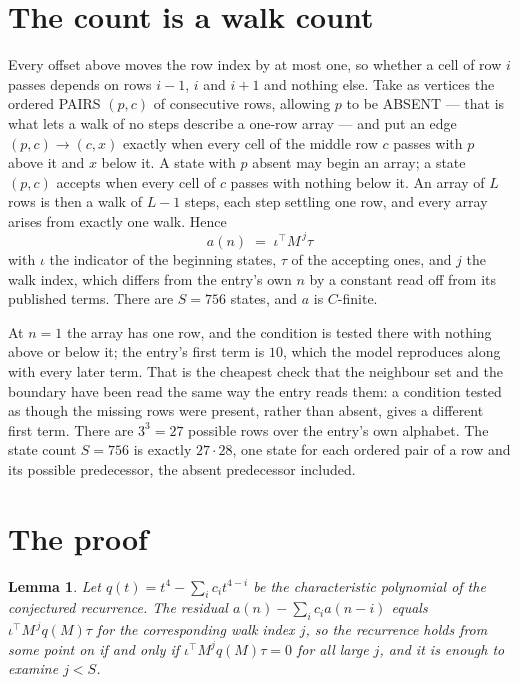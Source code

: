 \documentclass[11pt,a4paper]{article}
\theoremstyle{plain}
\newtheorem{lemma}[theorem]{Lemma}
\theoremstyle{definition}
\begin{document}
\section{The count is a walk count}

Every offset above moves the row index by at most one, so whether a cell of row $i$ passes
depends on rows $i-1$, $i$ and $i+1$ and nothing else. Take as vertices the ordered PAIRS
$(p,c)$ of consecutive rows, allowing $p$ to be ABSENT --- that is what lets a walk of no steps
describe a one-row array --- and put an edge $(p,c)\to(c,x)$ exactly when every cell of the
middle row $c$ passes with $p$ above it and $x$ below it. A state with $p$ absent may begin an
array; a state $(p,c)$ accepts when every cell of $c$ passes with nothing below it. An array of
$L$ rows is then a walk of $L-1$ steps, each step settling one row, and every array arises from
exactly one walk. Hence
\[
a(n)\;=\;\iota^{\!\top}M^{\,j}\tau
\]
with $\iota$ the indicator of the beginning states, $\tau$ of the accepting ones, and $j$ the
walk index, which differs from the entry's own $n$ by a constant read off from its published
terms. There are $S=756$ states, and $a$ is $C$-finite.

At $n=1$ the array has one row, and
the condition is tested there with nothing above or below it; the entry's first term is
$10$, which the model reproduces along with every later term. That is the cheapest check
that the neighbour set and the boundary have been read the same way the entry reads them: a
condition tested as though the missing rows were present, rather than absent, gives a different
first term. There are $3^{3}=27$ possible rows over the entry's own alphabet. The state count $S=756$ is exactly $27\cdot28$,
one state for each ordered pair of a row and its possible predecessor, the absent predecessor
included.

\section{The proof}

\begin{lemma}\label{lem:crit}
Let $q(t)=t^{4}-\sum_i c_it^{4-i}$ be the characteristic polynomial of the
conjectured recurrence. The residual $a(n)-\sum_ic_ia(n-i)$ equals
$\iota^{\!\top}M^{\,j}q(M)\tau$ for the corresponding walk index $j$, so the recurrence
holds from some point on if and only if $\iota^{\!\top}M^{j}q(M)\tau=0$ for all large $j$,
and it is enough to examine $j<S$.
\end{lemma}
\end{document}

